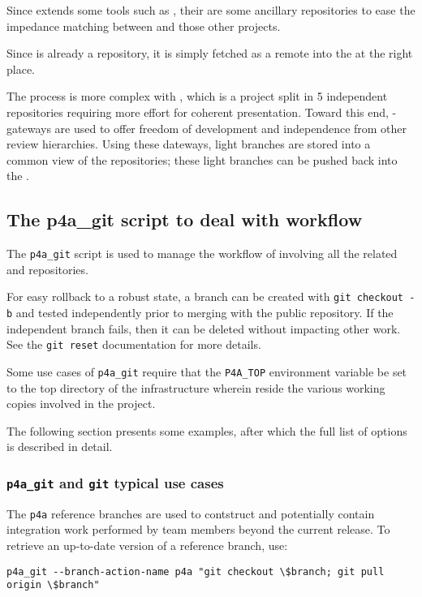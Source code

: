 \documentclass[a4paper]{article}
\begin{document}
Since \Apfa extends some tools such as \Apips, their are some
ancillary repositories to ease the impedance matching between \Apfa and
those other projects.

Since \Apolylib is already a \Agit repository, it is simply fetched as a
remote \Agit into the \Apfa at the right place.

The process is more complex with \Apips, which is a project split in 5
independent \Asvn repositories requiring more effort for coherent presentation.
Toward this end, \Asvn-\Agit gateways are used to offer freedom of
development and independence from other review hierarchies. Using
these dateways, light
branches are stored into a common \Agit view of the \Apips{} \Asvn
repositories; these light branches can be pushed back into the \Apips{} \Asvn.


\subsection{The p4a\_git script to deal with workflow}
\label{sec:p4a_git-script-deal}

The \verb|p4a_git| script is used to manage the workflow of \Apfa
involving all the related \Agit and \Asvn repositories.

For easy rollback to a robust state, a branch can be created with
\texttt{git checkout -b} and tested independently prior to merging
with the public repository. If the independent branch fails, then it
can be deleted without impacting other work.
See the \texttt{git reset} documentation for more details.

Some use cases of \verb|p4a_git| require that the \verb|P4A_TOP|
environment variable be set to the top directory of the \Apfa
infrastructure wherein reside the various \Agit working copies involved in the
project.

The following section presents some examples, after which the full
list of options is described in detail.


\subsubsection{\protect\texttt{p4a\_git} and \protect\texttt{git} typical use cases}
\label{sec:p4a_git-typical-use}

The \Apfa \texttt{p4a} reference branches are used to contstruct \Apfa
and potentially contain integration work performed by \Apfa team
members beyond the current release. To retrieve an up-to-date version
of a reference branch, use:
\begin{verbatim}
p4a_git --branch-action-name p4a "git checkout \$branch; git pull origin \$branch"
\end{verbatim}
\end{document}
